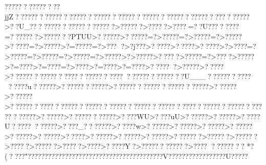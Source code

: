 {{{{{{{{{{{{{{{{{{{{{{{{{{{{{{{{{{{{{{{{{{{{{{{{{{{{{{{{{{{{{{{{{{{{{{{{{{{{{{{{{{{{{{{{{{{{{{{{{{{{{{{{{{{{{{{{{{{{{{{{{{{{{{{{{{{{{{{{{{{{{{{{{{{{{{{{{{{{{{{{{{{{{{{{{{{{{{{{{{{{{{{{{{{{{{{{{{{{{{{{{{{{{{{{{{{{{{{{{{{{{{{{{{{{{{{{{{{{{{{{{{{{{{{{{{{{{{{{{{{{{{{{{{{{{{{{{{{{{{{{{{{{{{{{{{{{{{{{{{{{{{{{{{{{{{{{{{{{{{{{{{{{{{{{{{{{{{{{{{{{{{{{{{{{{{{{{{{{{{{{{{{{{{{{{{{{{{{{{{{{{{{{{{{{{{{{{{{{{{{{{{{{{{{{{{{{{{{{{{{{{{{{{{{{{{{{{{{{{{{{{{{{{{{{{{{{{{{{{{{{{{{{{{{{{{{{{{{{{{{{{{{{{{{{{{{{{{{{{{{{{{{{{{{{{{{{{{{{{{{{{{{{{{{{{{{{{{{{{{{{{{{{{{{{{{{{{{{{{{{{{{{{{{{{{{{{{{{{{{{{{{{{{{{{{{{{{{{{{{{{{{{{{{{{{{{{{{{{{{{{{{{{{{{{{{{{{{{{{{{{{{{{{{{{{{{{{{{{{{{{{{{{{{{{{{{{{{{{{{{{{{{{{{{{{{{{{{{{{{{{{{{{{{{{{{{{{{{{{{{{{{{{{{{{{{{{{{{{{{{{{{{{{{{{{{{{{{{{{{{{{{{{{{{{{{{{{{{{{{{{{{{{{{{{{{{{{{{{{{{{{{{{{{{{{{{{{{{{{{{{{{{{{{{{{{{{{{{{{{{{{{{{{{{{{{{{{{{{{{{{{{{{{{{{{{{{{{{{{{{{{{{{{{{{{{{{{{{{{{{{{{{{{{{{{{{{{{{{{{{{{{{{{{{{{{{{{{{{{{{{{{{{{{{{{{{{{{{{{{{{{{{{{{{{{{{{{{{{{{{{{{{{{{{{{{{{{{{{{{{{{{{{{{{{{{{{{{{{{{{{{{{{{{{{{{{{{{{{{{{{{{{{{{{{{{{{{{{{{{{{{{{{{{{{{{{{{{{{{{{{{{{{{{{{{{{{{{{{{{{{{{{{{{{{{{{{{{{{{{{{{{{{{{{{{{{{{{{{{{{{{{{{{{{{{{{{{{{{{{{{{{{{{{{{{{{{{{{{{{{{{{{{{{{{{{{{{{{{{{{{{{{{{{{{{{{{{{{{{{{{{{{{{{{{{{{{{{{{{{{{{{{{{{{{{{{{{{{{{{{{{{{{{{{{{{{{{{{{{{{{{{{{{{{{{{{{{{{{{{{{{{{{{{{{{{{{{{{{{{{{{{{{{{{{{{{{{{{{{{{{{{{{{{{{{{{{{{{{{{{{{{{{{{{{{{{{{{{{{{{{{{{{{{{{{{{{{{{{{{{{{{{{{{{{{{{{{{{{{{{{{{{{{{{{{{{{{{{{{{{{{{{{{{{{{{{{{{{{{{{{{{{{{{{{{{{{{{{{{{{{{{{{{{{{{{{{{{{{{{{{{{{{{{{{{{{{{{{{{{{{{{{{{{{{{{{{{{{{{{{{{{{{{{{{{{{{{{{{{{{{{{{{{{{{{{{{{{{{{{{{{{{{{{{{{{{{{{{{{{{{{{{{{{{{{{{{{{{{{{{{{{{{{{{{{{{{{{{{{{{{{{{{{{{{{{{{{{{{{{{{{{{{{{{{{{{{{{{{{{{{{{{{{{{{{{{{{{{{{{{{{{{{{{{{{{{{{{{{{{{{{{{{{{{{{{{{{{{{{{{{{{{{{{{{{{{{{{{{{{{{{{{{{{{{{{{{{{{{{{{{{{{{{{{{{{{{{{{{{{{{{{{{{{{{{{{{{{{{{{{{{{{{{{{{{{{{{{{{{{{{{{{{{{{{{??????????????jjZ??????????????????????????????????????????????????????????>??U_?????????????????????>??????>???? ?>????=??U????? ???=???????>???????PTUU>??????>??????=?>?????=?>?????=?>?????>?????=?>?????>?=?????=?>??? ?>?j???>?????>?????>?????>?>???? =?>?????=?>?????=?>?????=?>?????>?>?????>??  ???>?????=?>????>?????>?=????>?=????=?>????>?=????>?=????>??????>?????>?????>??????????????????????????????????????????U___????????????????u??????>????????????>????????????????????????>??????>??????>??????????????????????????????????????????????????????????????????????>??????>????????????>????WU>????uU>??????>??????>?????U???????????>????_???????>?????w>??????>??????>??????>??????>??????>??????>?????>??????>??????>??????>???????>??????>??????>???? ?>??????>???? ?>???? >?????Y?>????????????>????
???????? *?(????"????????????????????????????????????????V?????????????????U????? }}}}}}}}}}}}}}}}}}}}}}}}}}}}}}}}}}}}}}}}}}}}}}}}}}}}}}}}}}}}}}}}}}}}}}}}}}}}}}}}}}}}}}}}}}}}}}}}}}}}}}}}}}}}}}}}}}}}}}}}}}}}}}}}}}}}}}}}}}}}}}}}}}}}}}}}}}}}}}}}}}}}}}}}}}}}}}}}}}}}}}}}}}}}}}}}}}}}}}}}}}}}}}}}}}}}}}}}}}}}}}}}}}}}}}}}}}}}}}}}}}}}}}}}}}}}}}}}}}}}}}}}}}}}}}}}}}}}}}}}}}}}}}}}}}}}}}}}}}}}}}}}}}}}}}}}}}}}}}}}}}}}}}}}}}}}}}}}}}}}}}}}}}}}}}}}}}}}}}}}}}}}}}}}}}}}}}}}}}}}}}}}}}}}}}}}}}}}}}}}}}}}}}}}}}}}}}}}}}}}}}}}}}}}}}}}}}}}}}}}}}}}}}}}}}}}}}}}}}}}}}}}}}}}}}}}}}}}}}}}}}}}}}}}}}}}}}}}}}}}}}}}}}}}}}}}}}}}}}}}}}}}}}}}}}}}}}}}}}}}}}}}}}}}}}}}}}}}}}}}}}}}}}}}}}}}}}}}}}}}}}}}}}}}}}}}}}}}}}}}}}}}}}}}}}}}}}}}}}}}}}}}}}}}}}}}}}}}}}}}}}}}}}}}}}}}}}}}}}}}}}}}}}}}}}}}}}}}}}}}}}}}}}}}}}}}}}}}}}}}}}}}}}}}}}}}}}}}}}}}}}}}}}}}}}}}}}}}}}}}}}}}}}}}}}}}}}}}}}}}}}}}}}}}}}}}}}}}}}}}}}}}}}}}}}}}}}}}}}}}}}}}}}}}}}}}}}}}}}}}}}}}}}}}}}}}}}}}}}}}}}}}}}}}}}}}}}}}}}}}}}}}}}}}}}}}}}}}}}}}}}}}}}}}}}}}}}}}}}}}}}}}}}}}}}}}}}}}}}}}}}}}}}}}}}}}}}}}}}}}}}}}}}}}}}}}}}}}}}}}}}}}}}}}}}}}}}}}}}}}}}}}}}}}}}}}}}}}}}}}}}}}}}}}}}}}}}}}}}}}}}}}}}}}}}}}}}}}}}}}}}}}}}}}}}}}}}}}}}}}}}}}}}}}}}}}}}}}}}}}}}}}}}}}}}}}}}}}}}}}}}}}}}}}}}}}}}}}}}}}}}}}}}}}}}}}}}}}}}}}}}}}}}}}}}}}}}}}}}}}}}}}}}}}}}}}}}}}}}}}}}}}}}}}}}}}}}}}}}}}}}}}}}}}}}}}}}}}}}}}}}}}}}}}}}}}}}}}}}}}}}}}}}}}}}}}}}}}}}}}}}}}}}}}}}}}}}}}}}}}}}}}}}}}}}}}}}}}}}}}}}}}}}}}}}}}}}}}}}}}}}}}}}}}}}}}}}}}}}}}}}}}}}}}}}}}}}}}}}}}}}}}}}}}}}}}}}}}}}}}}}}}}}}}}}}}}}}}}}}}}}}}}}}}}}}}}}}}}}}}}}}}}}}}}}}}}}}}}}}}}}}}}}}}}}}}}}}}}}}}}}}}}}}}}}}}}}}}}}}}}}}}}}}}}}}}}}}}}}}}}}}}}}}}}}}}}}}}}}}}}}}}}}}}}}}}}}}}}}}}}}}}}}}}}}}}}}}}}}}}}}}}}}}}}}}}}}}}}}}}}}}}}}}}}}}}}}}}}}}}}}}}}}}}}}}}}}}}}}}}}}}}}}}}}}}}}}}}}}}}}}}}}}}}}}}}}}}}}}}}}}}}}}}}}}}}}}}}}}}}}}}}}}}}}}}}}}}}}}}}}}}}}}}}}}}}}}}}}}}}}}}}}}}}}}}}}}}}}}}}}}}}}}}}}}}}}}}}}}}}}}}}}}}}}}}}}}}}}}}}}}}}}}}}}}}}}}}}}}}}}}}}}}}}}}}}}}}}}}}}}}}}}}}}}}}}}}}}}}}}}}}}}}}}}
